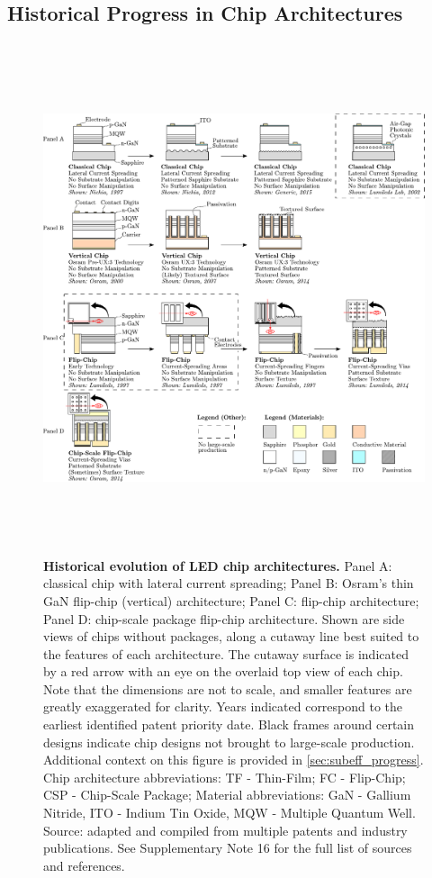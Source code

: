 \documentclass[parskip=full]{article}
\begin{document}
\clearpage

\subsection{Historical Progress in Chip Architectures}
\label{sec:chip_architecture}

\begin{figure}[h!]
\centering
\includegraphics[height=15cm]{figures/chip_architecture_overview.pdf}
\caption{\textbf{Historical evolution of LED chip architectures.} Panel A: classical chip with lateral current spreading; Panel B: Osram’s thin GaN flip-chip (vertical) architecture; Panel C: flip-chip architecture; Panel D: chip-scale package flip-chip architecture. Shown are side views of chips without packages, along a cutaway line best suited to the features of each architecture. The cutaway surface is indicated by a red arrow with an eye on the overlaid top view of each chip. Note that the dimensions are not to scale, and smaller features are greatly exaggerated for clarity. Years indicated correspond to the earliest identified patent priority date. Black frames around certain designs indicate chip designs not brought to large-scale production. Additional context on this figure is provided in \cref{sec:subeff_progress}. Chip architecture abbreviations: TF - Thin-Film; FC - Flip-Chip; CSP - Chip-Scale Package; Material abbreviations: GaN - Gallium Nitride, ITO - Indium Tin Oxide, MQW - Multiple Quantum Well. Source: adapted and compiled from multiple patents and industry publications. See Supplementary Note 16 for the full list of sources and references.}
\label{fgr:chip_architecture_overview}
\end{figure}
\end{document}
